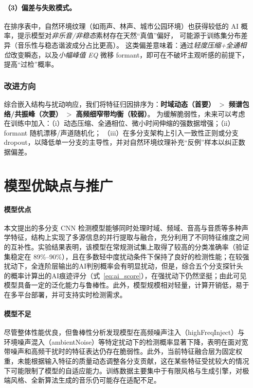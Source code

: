 \documentclass[a4paper,12pt]{article}
\begin{document}
\paragraph{（3）偏差与失败模式。}
在排序表中，自然环境纹理（如雨声、林声、城市公园环境）也获得较低的 AI 概率，提示模型对\emph{非乐音/非稳态}素材存在天然“真值”偏好，
可能源于训练集分布差异（音乐性与稳态谐波成分占比更高）。
这类偏差意味着：通过\emph{轻度压缩+全通相位}改变瞬态，以及\emph{小幅峰值 EQ} 微移 formant，即可在不破坏主观听感的前提下，提高“过检”概率。

\subsubsection{改进方向}
综合嵌入结构与扰动响应，我们将特征归因排序为：\textbf{时域动态（首要）} $>$ \textbf{频谱包络/共振峰（次要）} $>$ \textbf{高频细窄带均衡（较弱）}。
为缓解脆弱性，未来可以考虑在训练中加入：（i）动态压缩、全通相位、微小时间伸缩的强数据增强；（ii）formant 随机漂移/声道随机化；
（iii）在多分支架构上引入一致性正则或分支 dropout，以降低单一分支的主导性，并对自然环境纹理补充“反例”样本以纠正数据偏差。


\section{模型优缺点与推广}

\paragraph{模型优点} 
本文提出的多分支 CNN 检测模型能够同时处理时域、频域、音高与音质等多种声学特征，结构上实现了多源信息的并行提取与融合，充分利用了不同特征维度之间的互补性。实验结果表明，该模型在常规测试集上取得了较高的分类准确率（验证集稳定在 89\%--90\%），且在多数轻中度扰动条件下保持了良好的检测性能；在较强扰动下，全连阶层输出的AI判别概率会有明显扰动，但是，综合五个分支探针头的概率计算出的AI痕迹评分（式~\ref{eq:ai_score}），在强扰动下仍然坚挺；由此可见模型具备一定的泛化能力与鲁棒性。此外，模型规模相对轻量，计算开销低，易于在多平台部署，并可支持实时检测需求。

\paragraph{模型不足} 
尽管整体性能优良，但鲁棒性分析发现模型在高频噪声注入（highFreqInject）与环境噪声混入（ambientNoise）等特定扰动下的检测概率显著下降，表明在面对宽带噪声和高频干扰时的特征表达仍存在脆弱性。此外，当前特征融合层为固定权重，未能根据输入特征的质量动态调整各分支贡献，这在某些特征受扰较大的情况下可能限制了模型的自适应能力。训练数据主要集中于有限风格与生成引擎，对极端风格、全新算法生成的音乐仍可能存在适配不足。
\end{document}
